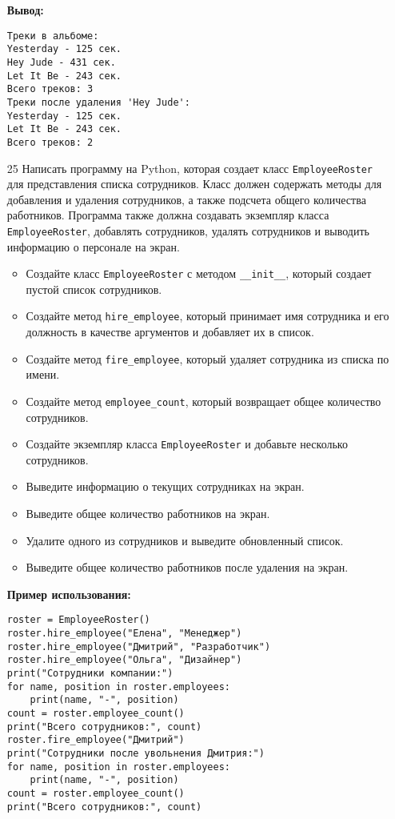 \begin{enumerate}
\textbf{Вывод:}
\begin{verbatim}
Треки в альбоме:
Yesterday - 125 сек.
Hey Jude - 431 сек.
Let It Be - 243 сек.
Всего треков: 3
Треки после удаления 'Hey Jude':
Yesterday - 125 сек.
Let It Be - 243 сек.
Всего треков: 2
\end{verbatim}

\item[25] Написать программу на Python, которая создает класс \texttt{EmployeeRoster} для представления списка сотрудников. Класс должен содержать методы для добавления и удаления сотрудников, а также подсчета общего количества работников. Программа также должна создавать экземпляр класса \texttt{EmployeeRoster}, добавлять сотрудников, удалять сотрудников и выводить информацию о персонале на экран.

\begin{itemize}
    \item Создайте класс \texttt{EmployeeRoster} с методом \texttt{\_\_init\_\_}, который создает пустой список сотрудников.
    \item Создайте метод \texttt{hire\_employee}, который принимает имя сотрудника и его должность в качестве аргументов и добавляет их в список.
    \item Создайте метод \texttt{fire\_employee}, который удаляет сотрудника из списка по имени.
    \item Создайте метод \texttt{employee\_count}, который возвращает общее количество сотрудников.
    \item Создайте экземпляр класса \texttt{EmployeeRoster} и добавьте несколько сотрудников.
    \item Выведите информацию о текущих сотрудниках на экран.
    \item Выведите общее количество работников на экран.
    \item Удалите одного из сотрудников и выведите обновленный список.
    \item Выведите общее количество работников после удаления на экран.
\end{itemize}

\textbf{Пример использования:}

\begin{verbatim}
roster = EmployeeRoster()
roster.hire_employee("Елена", "Менеджер")
roster.hire_employee("Дмитрий", "Разработчик")
roster.hire_employee("Ольга", "Дизайнер")
print("Сотрудники компании:")
for name, position in roster.employees:
    print(name, "-", position)
count = roster.employee_count()
print("Всего сотрудников:", count)
roster.fire_employee("Дмитрий")
print("Сотрудники после увольнения Дмитрия:")
for name, position in roster.employees:
    print(name, "-", position)
count = roster.employee_count()
print("Всего сотрудников:", count)
\end{verbatim}


\end{enumerate}
